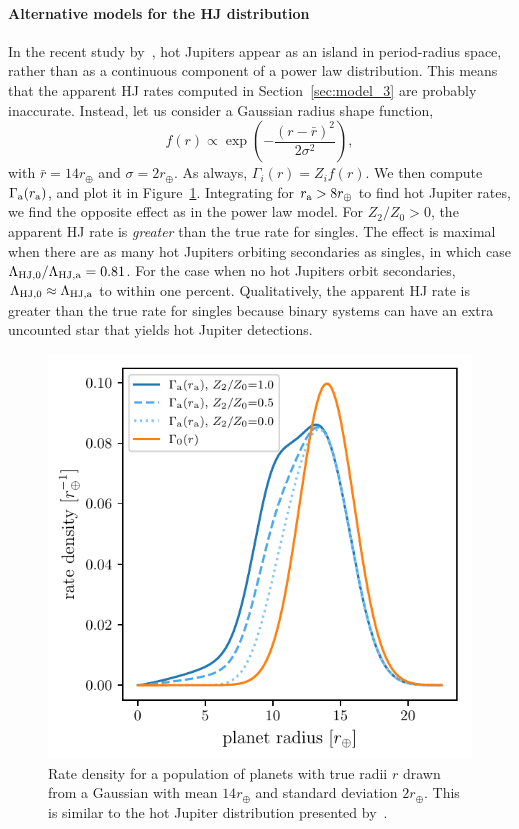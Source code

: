 \documentclass[12pt,modern]{aastex61}
\renewcommand{\a}{_{\rm a}}
\begin{document}
\paragraph{Alternative models for the HJ distribution}

In the recent study by~\citet{petigura_CKS_2017}, hot Jupiters appear as an 
island in period-radius space, rather than as a continuous component of a 
power law distribution.
This means that the apparent HJ rates computed in 
Section~\ref{sec:model_3} are probably inaccurate.
Instead, let us consider a Gaussian radius shape function,
\begin{equation}
f(r) \propto \exp \left( -\frac{(r-\bar{r})^2}{2\sigma^2} \right),
\end{equation}
with $\bar{r} = 14r_\oplus$ and $\sigma = 2r_\oplus$.
As always, $\Gamma_i(r) = Z_i f(r)$.
We then compute $\Gamma\a(r\a)$, and plot it in Figure~\ref{fig:gaussian_HJ}.
Integrating for $r\a > 8r_\oplus$ to find hot Jupiter rates,
we find the opposite effect as in the power law model.
For $Z_2/Z_0>0$, 
the apparent HJ rate is {\it greater} than the true rate for singles.
The effect is maximal when there are as many hot Jupiters orbiting secondaries 
as singles, in which case
$\Lambda_{{\rm HJ},0}/\Lambda_{\rm HJ,a} = 0.81$.
For the case when no hot Jupiters orbit secondaries, $\Lambda_{{\rm HJ},0} 
\approx \Lambda_{\rm HJ,a}$ to within one percent.
Qualitatively, the apparent HJ rate is greater than the true rate for 
singles because binary systems can have an extra uncounted star that yields 
hot Jupiter detections.


\begin{figure}[!tb]
    \centering
    \includegraphics[width=.6\textwidth]{figures/int_rate_density_vs_radius_model_7_rpu_22.5_manyZs.pdf}
    \caption{
        Rate density for a population of planets with true radii $r$ drawn from
        a Gaussian with mean $14r_\oplus$ and standard deviation $2r_\oplus$.
        This is similar to the hot Jupiter distribution presented 
        by~\citet{petigura_CKS_2017}.
    }
    \label{fig:gaussian_HJ}
\end{figure}
\end{document}
